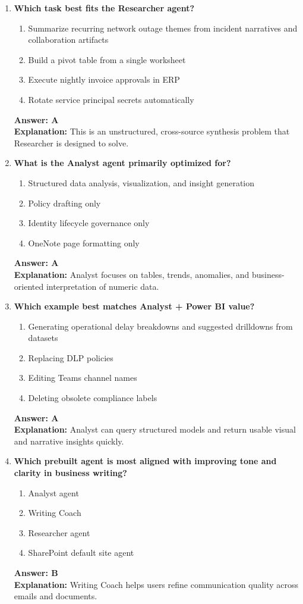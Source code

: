 \documentclass[10pt]{article}
\begin{document}
\begin{enumerate}[leftmargin=*]
\item \textbf{Which task best fits the Researcher agent?}
\begin{enumerate}[label=\Alph*.]
  \item Summarize recurring network outage themes from incident narratives and collaboration artifacts
  \item Build a pivot table from a single worksheet
  \item Execute nightly invoice approvals in ERP
  \item Rotate service principal secrets automatically
\end{enumerate}
\textbf{Answer: A}\\
\textbf{Explanation:} This is an unstructured, cross-source synthesis problem that Researcher is designed to solve.

\item \textbf{What is the Analyst agent primarily optimized for?}
\begin{enumerate}[label=\Alph*.]
  \item Structured data analysis, visualization, and insight generation
  \item Policy drafting only
  \item Identity lifecycle governance only
  \item OneNote page formatting only
\end{enumerate}
\textbf{Answer: A}\\
\textbf{Explanation:} Analyst focuses on tables, trends, anomalies, and business-oriented interpretation of numeric data.

\item \textbf{Which example best matches Analyst + Power BI value?}
\begin{enumerate}[label=\Alph*.]
  \item Generating operational delay breakdowns and suggested drilldowns from datasets
  \item Replacing DLP policies
  \item Editing Teams channel names
  \item Deleting obsolete compliance labels
\end{enumerate}
\textbf{Answer: A}\\
\textbf{Explanation:} Analyst can query structured models and return usable visual and narrative insights quickly.

\item \textbf{Which prebuilt agent is most aligned with improving tone and clarity in business writing?}
\begin{enumerate}[label=\Alph*.]
  \item Analyst agent
  \item Writing Coach
  \item Researcher agent
  \item SharePoint default site agent
\end{enumerate}
\textbf{Answer: B}\\
\textbf{Explanation:} Writing Coach helps users refine communication quality across emails and documents.


\end{enumerate}
\end{document}
